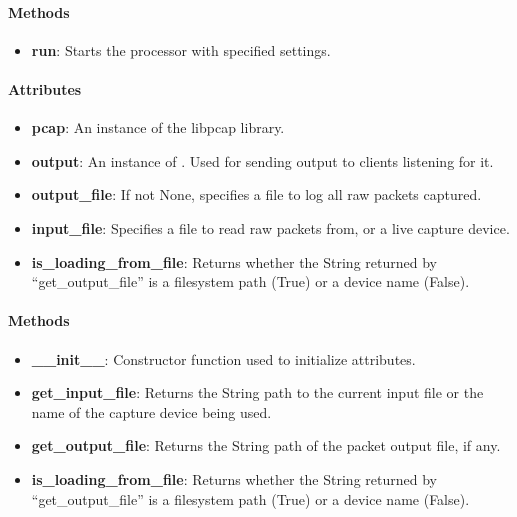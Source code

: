 \documentclass[titlepage]{article}
\begin{document}
\paragraph{Methods}
\begin{itemize}
    \item \textbf{run}: Starts the processor with specified settings.
\end{itemize}

\paragraph{Attributes}
\begin{itemize}
    \item \textbf{pcap}: An instance of the libpcap library.
    \item \textbf{output}: An instance of .  Used
        for sending output to clients listening for it.
    \item \textbf{output\_file}: If not None, specifies a file to log all raw
        packets captured.
    \item \textbf{input\_file}: Specifies a file to read raw packets from, or a
        live capture device.
    \item \textbf{is\_loading\_from\_file}: Returns whether the String returned
        by ``get\_output\_file'' is a filesystem path (True) or a device name
        (False).
\end{itemize}

\paragraph{Methods}
\begin{itemize}
    \item \textbf{\_\_init\_\_}: Constructor function used to initialize
        attributes.
    \item \textbf{get\_input\_file}: Returns the String path to the current
        input file or the name of the capture device being used.
    \item \textbf{get\_output\_file}: Returns the String path of the packet
        output file, if any.
    \item \textbf{is\_loading\_from\_file}: Returns whether the String returned
        by ``get\_output\_file'' is a filesystem path (True) or a device name
        (False).
\end{itemize}


%
\end{document}
